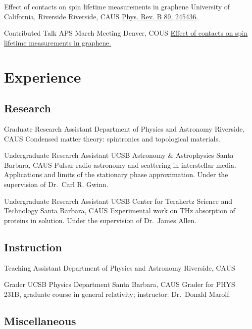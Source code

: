 \documentclass[10pt,letter]{moderncv}
\begin{document}
    {Effect of contacts on spin lifetime measurements in graphene}
    {University of California, Riverside}
    {Riverside, CA}{US}
    {\href{https://journals.aps.org/prb/abstract/10.1103/PhysRevB.89.245436}
      {Phys. Rev. B 89, 245436.}}

    {Contributed Talk}
    {APS March Meeting}
    {Denver, CO}{US}
    {\href{https://evansosenko.com/deck-spin-lifetime/}
      {Effect of contacts on spin lifetime measurements in graphene.}}

  \section{Experience}

  \subsection{Research}

    {Graduate Research Assistant}
    {Department of Physics and Astronomy}
    {Riverside, CA}{US}
    {Condensed matter theory: spintronics and topological materials.}

    {Undergraduate Research Assistant}
    {UCSB Astronomy \& Astrophysics}
    {Santa Barbara, CA}{US}
    {Pulsar radio astronomy and scattering in interstellar media.
      Applications and limits of the stationary phase approximation.
      Under the supervision of Dr.~Carl R. Gwinn.}

    {Undergraduate Research Assistant}
    {UCSB Center for Terahertz Science and Technology}
    {Santa Barbara, CA}{US}
    {Experimental work on THz absorption of proteins in solution.
      Under the supervision  of Dr.~James Allen.}

  \subsection{Instruction}

    {Teaching Assistant}
    {Department of Physics and Astronomy}
    {Riverside, CA}{US}{}

    {Grader}
    {UCSB Physics Department}
    {Santa Barbara, CA}{US}
    {Grader for PHYS 231B, graduate course in general relativity; instructor: Dr.~Donald Marolf.}

  \subsection{Miscellaneous}
\end{document}
